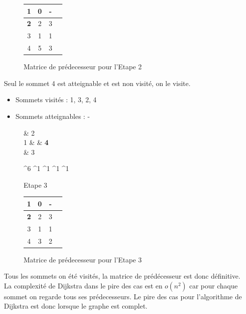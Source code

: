 \documentclass[a4paper,12pt,final] {article}
\begin{document}
\begin{figure}[htpd]
\begin{center}
\begin{tabular}{|c|c|c|c|}
\hline
 1 & 0 & - \\
\hline
{\color{red} \bf 2} & 2 & 3 \\
\hline
3 & 1 & 1 \\
\hline
4 & 5 & 3 \\
\hline
\end{tabular}
\end{center}
\caption{Matrice de prédecesseur pour l'Etape 2}
\end{figure}
Seul le sommet 4 est atteignable et est non visité, on le visite.
\begin{itemize}
\item Sommets visités : 1, 3, 2, 4
\item Sommets atteignables : -
\end{itemize}
\begin{figure}[htpd]
 \centering
 \begin{psmatrix}[mnode=circle]
	    & 2\\
	1 &    & {\color{red} \bf 4}\\
	    &  3\\
\end{psmatrix}
	
	^{6}
	^{1}
	^{1}
	^{1}
	^{1}

  \caption{Etape 3}
\end{figure}

\begin{figure}[htpd]
\begin{center}
\begin{tabular}{|c|c|c|c|}
\hline
 1 & 0 & - \\
\hline
{\color{red} \bf 2} & 2 & 3 \\
\hline
3 & 1 & 1 \\
\hline
4 & 3 & 2 \\
\hline
\end{tabular}
\end{center}
\caption{Matrice de prédecesseur pour l'Etape 3}
\end{figure}
Tous les sommets on été visités, la matrice de prédécesseur est donc définitive.\\
La complexité de Dijkstra dans le pire des cas est en $o(n^{2})$ car pour chaque sommet on regarde tous ses prédecesseurs. Le pire des cas pour l'algorithme de Dijkstra est donc lorsque le graphe est complet.
\end{document}
